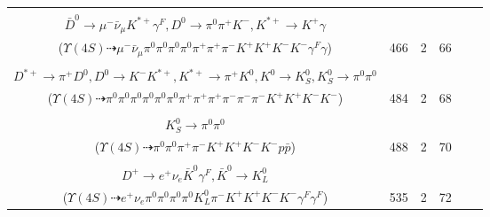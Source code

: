 \documentclass[landscape]{article}
\newcounter{rownumbers}
\newcommand\rn{\stepcounter{rownumbers}\arabic{rownumbers}}
\newcommand{\EOLP}{\\ \hline} %
\newcommand{\topoTags}[1]{#1} %
\begin{document}
\begin{longtable}{clcccc}
\rn & \makecell[l]{ $ 
\Upsilon(4S) \rightarrow B^{0} \bar{B}^{0} ,
B^{0} \rightarrow K^{+} D^{*-} D^{*0} ,
\bar{B}^{0} \rightarrow \pi^{0} D^{0} ,
D^{*-} \rightarrow \pi^{-} \bar{D}^{0} ,
D^{*0} \rightarrow \pi^{0} D^{0} ,
D^{0} \rightarrow \pi^{0} \pi^{+} K^{-} ,
$ \\ $
\bar{D}^{0} \rightarrow \mu^{-} \bar{\nu}_{\mu} K^{*+} \gamma^{F} ,
D^{0} \rightarrow \pi^{0} \pi^{+} K^{-} ,
K^{*+} \rightarrow K^{+} \gamma 
$ \\ ($
\Upsilon(4S) \dashrightarrow \mu^{-} \bar{\nu}_{\mu} \pi^{0} \pi^{0} \pi^{0} \pi^{0} \pi^{+} \pi^{+} \pi^{-} K^{+} K^{+} K^{-} K^{-} \gamma^{F} \gamma 
$) } & \topoTags{466 & }2 & 66 \EOLP

\rn & \makecell[l]{ $ 
\Upsilon(4S) \rightarrow B^{0} \bar{B}^{0} ,
B^{0} \rightarrow \rho^{-} K_{0}^{*+} ,
\bar{B}^{0} \rightarrow \pi^{0} \pi^{-} \eta K^{+} K^{-} D^{*+} ,
\rho^{-} \rightarrow \pi^{0} \pi^{-} ,
K_{0}^{*+} \rightarrow \pi^{0} K^{+} ,
\eta \rightarrow \pi^{0} \pi^{+} \pi^{-} ,
$ \\ $
D^{*+} \rightarrow \pi^{+} D^{0} ,
D^{0} \rightarrow K^{-} K^{*+} ,
K^{*+} \rightarrow \pi^{+} K^{0} ,
K^{0} \rightarrow K_{S}^{0} ,
K_{S}^{0} \rightarrow \pi^{0} \pi^{0} 
$ \\ ($
\Upsilon(4S) \dashrightarrow \pi^{0} \pi^{0} \pi^{0} \pi^{0} \pi^{0} \pi^{0} \pi^{+} \pi^{+} \pi^{+} \pi^{-} \pi^{-} \pi^{-} K^{+} K^{+} K^{-} K^{-} 
$) } & \topoTags{484 & }2 & 68 \EOLP

\rn & \makecell[l]{ $ 
\Upsilon(4S) \rightarrow B^{0} \bar{B}^{0} ,
B^{0} \rightarrow \pi^{-} K^{+} \eta_{c} ,
\bar{B}^{0} \rightarrow \bar{K}^{0} K^{+} K^{-} ,
\eta_{c} \rightarrow K^{-} p \bar{\Lambda} ,
\bar{K}^{0} \rightarrow K_{S}^{0} ,
\bar{\Lambda} \rightarrow \pi^{+} \bar{p} ,
$ \\ $
K_{S}^{0} \rightarrow \pi^{0} \pi^{0} 
$ \\ ($
\Upsilon(4S) \dashrightarrow \pi^{0} \pi^{0} \pi^{+} \pi^{-} K^{+} K^{+} K^{-} K^{-} p \bar{p} 
$) } & \topoTags{488 & }2 & 70 \EOLP

\rn & \makecell[l]{ $ 
\Upsilon(4S) \rightarrow B^{0} \bar{B}^{0} ,
B^{0} \rightarrow \pi^{0} K^{+} K^{-} ,
\bar{B}^{0} \rightarrow \rho^{-} K^{+} K^{*-} D^{*+} \gamma^{F} ,
\rho^{-} \rightarrow \pi^{0} \pi^{-} ,
K^{*-} \rightarrow \pi^{0} K^{-} ,
D^{*+} \rightarrow \pi^{0} D^{+} ,
$ \\ $
D^{+} \rightarrow e^{+} \nu_{e} \bar{K}^{0} \gamma^{F} ,
\bar{K}^{0} \rightarrow K_{L}^{0} 
$ \\ ($
\Upsilon(4S) \dashrightarrow e^{+} \nu_{e} \pi^{0} \pi^{0} \pi^{0} \pi^{0} K_{L}^{0} \pi^{-} K^{+} K^{+} K^{-} K^{-} \gamma^{F} \gamma^{F} 
$) } & \topoTags{535 & }2 & 72 \EOLP


\end{longtable}
\end{document}
